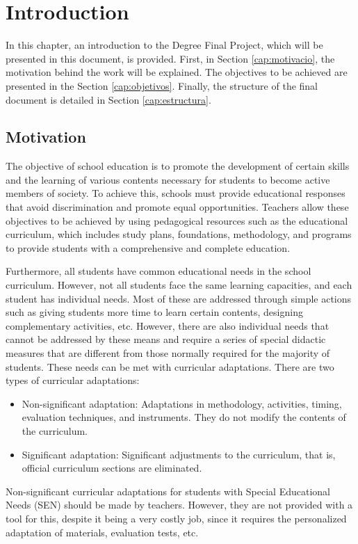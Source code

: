 \chapter{Introduction}
\label{cap:introduction}

In this chapter, an introduction to the Degree Final Project, which will be presented in this document, is provided. First, in Section \ref{cap:motivacio}, the motivation behind the work will be explained. The objectives to be achieved are presented in the Section \ref{cap:objetivos}. Finally, the structure of the final document is detailed in Section \ref{cap:estructura}.


\section{Motivation}\label{cap:motivation}
The objective of school education is to promote the development of certain skills and the learning of various contents necessary for students to become active members of society. To achieve this, schools must provide educational responses that avoid discrimination and promote equal opportunities. Teachers allow these objectives to be achieved by using pedagogical resources such as the educational curriculum, which includes study plans, foundations, methodology, and programs to provide students with a comprehensive and complete education.

Furthermore, all students have common educational needs in the school curriculum. However, not all students face the same learning capacities, and each student has individual needs. Most of these are addressed through simple actions such as giving students more time to learn certain contents, designing complementary activities, etc. However, there are also individual needs that cannot be addressed by these means and require a series of special didactic measures that are different from those normally required for the majority of students. These needs can be met with curricular adaptations. There are two types of curricular adaptations:
\begin{itemize}
\item Non-significant adaptation: Adaptations in methodology, activities, timing, evaluation techniques, and instruments. They do not modify the contents of the curriculum.
\item Significant adaptation: Significant adjustments to the curriculum, that is, official curriculum sections are eliminated.
\end{itemize}
Non-significant curricular adaptations for students with Special Educational Needs (SEN) should be made by teachers. However, they are not provided with a tool for this, despite it being a very costly job, since it requires the personalized adaptation of materials, evaluation tests, etc.

